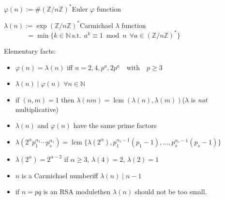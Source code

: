 \documentclass[landscape]{powersem} %
\newcommand{\Z}{{\mathbb Z}}
\newcommand{\N}{{\mathbb N}}
\newcommand{\matitablu}{\textcolor{MidnightBlue}{\ding{46}}}
\newcommand{\heading}[1]{%
 \begin{center}
  \large\bf
  \shadowbox{{\textcolor{conceptcolor}{#1}}}%
 \end{center}
 \vspace{1ex minus 1ex}}
\begin{document}
\begin{slide}
\heading{Introduction}\pause\vspace{-2mm}
{\Large$\varphi(n):=\#(\Z/n\Z)^*$\hfill Euler $\varphi$
function}\pause

{\Large$\lambda(n):=\exp(\Z/n\Z)^*$\hfill Carmichael $\lambda$
function}\pause $\qquad\ \ \ \ \ \ =\min\{k\in\N\ \text{s.t.}\ \
a^k\equiv1\bmod n\ \  \forall a\in(\Z/n\Z)^*\}$\pause

\noindent\textcolor{BurntOrange}{Elementary facts:}\pause\vspace{-2mm}
\begin{itemize}
\item[\matitablu] $\varphi(n)=\lambda(n)$ \hfill iff $n=2,4,p^a,2p^a$\ \ with\ \  $p\geq3$\pause
\item[\matitablu] $\lambda(n)\mid\varphi(n)$ \hfill $\forall n\in\N$\pause
\item[\matitablu] if $(n,m)=1$ then $\lambda(nm)=\operatorname{lcm}(\lambda(n),\lambda(m))$\hfill  ($\lambda$ is \emph{not} multiplicative)\pause
\item[\matitablu] $\lambda(n)$ and $\varphi(n)$ have the same prime factors\pause
\item[\matitablu] $\lambda(2^\alpha p_1^{\alpha_1}\cdots p_s^{\alpha_s})=
\operatorname{lcm}\{\lambda(2^\alpha),p_1^{\alpha_1-1}(p_1-1),\ldots,p_s^{\alpha_s-1}(p_s-1)\}$\pause
\item[\matitablu] $\lambda(2^\alpha)=2^{\alpha-2}$ if $\alpha\geq3$, $\lambda(4)=2$, $\lambda(2)=1$\pause
\item[\matitablu] $n$ is a Carmichael number\qquad iff \qquad $\lambda(n)\mid n-1$\pause
\item[\matitablu] if $n=pq$ is an RSA module\quad then $\lambda(n)$ should not be too small.
\end{itemize}
\end{slide}
\end{document}
